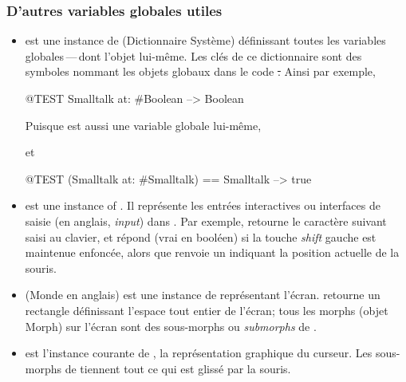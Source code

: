 \documentclass[a4paper,10pt,twoside]{book}
\begin{document}

\subsubsection{D'autres variables globales utiles}

\begin{itemize}
\item
{} est une instance de  (Dictionnaire Système) définissant toutes les variables globales\,---\,dont l'objet  lui-même.   
Les clés de ce dictionnaire sont des symboles nommant les objets globaux dans le code \st.
Ainsi par exemple,
\begin{code}{@TEST}
Smalltalk at: #Boolean --> Boolean
\end{code}
Puisque  est aussi une variable globale lui-même,
\begin{code}{}
Smalltalk at: #Smalltalk-->a SystemDictionary(lots of globals)}
\end{code} 
et
\begin{code}{@TEST}
(Smalltalk at: #Smalltalk) == Smalltalk --> true
\end{code}

\item {} est une instance of . Il représente les entrées interactives ou interfaces de saisie (en anglais, \emph{input}) dans \pharo. Par exemple,  retourne le caractère suivant saisi au clavier, et  répond  (vrai en booléen) si la touche \emph{shift} gauche est maintenue enfoncée, alors que  renvoie un  indiquant la position actuelle de la souris.

\item {} (Monde en anglais) est une instance de  représentant l'écran.
 retourne un rectangle définissant l'espace tout entier de l'écran; tous les morphs (objet Morph) sur l'écran sont des sous-morphs ou \emph{submorphs} de .

\item {} est l'instance courante de , la représentation graphique du curseur. Les sous-morphs de  tiennent tout ce qui est glissé par la souris.


\end{itemize}
\end{document}
